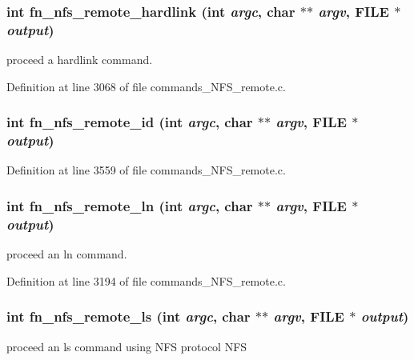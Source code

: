 \subsubsection[{fn\_\-nfs\_\-remote\_\-hardlink}]{\setlength{\rightskip}{0pt plus 5cm}int fn\_\-nfs\_\-remote\_\-hardlink (int {\em argc}, \/  char $\ast$$\ast$ {\em argv}, \/  FILE $\ast$ {\em output})}\label{commands__NFS__remote_8c_ad279971191c169cab4a91142e7346a68}
proceed a hardlink command. 

Definition at line 3068 of file commands\_\-NFS\_\-remote.c.
\subsubsection[{fn\_\-nfs\_\-remote\_\-id}]{\setlength{\rightskip}{0pt plus 5cm}int fn\_\-nfs\_\-remote\_\-id (int {\em argc}, \/  char $\ast$$\ast$ {\em argv}, \/  FILE $\ast$ {\em output})}\label{commands__NFS__remote_8c_adfe70596d1556c3acd01ba17fbe7bda8}


Definition at line 3559 of file commands\_\-NFS\_\-remote.c.
\subsubsection[{fn\_\-nfs\_\-remote\_\-ln}]{\setlength{\rightskip}{0pt plus 5cm}int fn\_\-nfs\_\-remote\_\-ln (int {\em argc}, \/  char $\ast$$\ast$ {\em argv}, \/  FILE $\ast$ {\em output})}\label{commands__NFS__remote_8c_ae4a85d683c2bf488befc5192af4a2490}
proceed an ln command. 

Definition at line 3194 of file commands\_\-NFS\_\-remote.c.
\subsubsection[{fn\_\-nfs\_\-remote\_\-ls}]{\setlength{\rightskip}{0pt plus 5cm}int fn\_\-nfs\_\-remote\_\-ls (int {\em argc}, \/  char $\ast$$\ast$ {\em argv}, \/  FILE $\ast$ {\em output})}\label{commands__NFS__remote_8c_a2f6620b40e586fff30ce7325049d29a7}
proceed an ls command using NFS protocol NFS 

